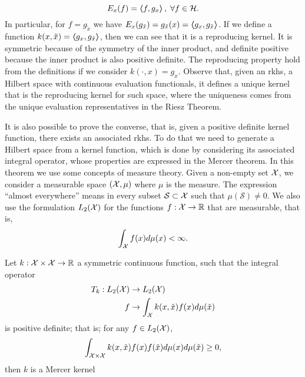 $$ E_x(f) = \bm{\left\langle} f, g_x \bm{\right\rangle}, \; \forall f \in \mathcal{H}.$$
In particular, for $f = g_{\tilde{x}}$ we have $E_x(g_{\tilde{x}}) = g_{{\tilde{x}}}(x) = \bm{\left\langle} g_x, g_{\tilde{x}} \bm{\right\rangle}$. If we define a function $k(x, \tilde{x}) = \bm{\left\langle} g_x, g_{\tilde{x}} \bm{\right\rangle}$, then we can see that it is a reproducing kernel. It is symmetric because of the symmetry of the inner product, and definite positive because the inner product is also positive definite. The reproducing property 
hold from the definitions if we consider $k(\cdot, x) = g_x$.
%
Observe that, given an \acrshort{rkhs}, a Hilbert space with continuous evaluation functionals, it defines a unique kernel that is the reproducing kernel for such space, where the uniqueness comes from the unique evaluation representatives in the Riesz Theorem.
%

It is also possible to prove the converse, that is, given a positive definite kernel function, there exists an associated \acrshort{rkhs}.
To do that we need to generate a Hilbert space from a kernel function, which is done by considering its associated integral operator, whose properties are expressed in the Mercer theorem. In this theorem we use some concepts of measure theory. 
%
Given a non-empty set $\mathcal{X}$, we consider a measurable space $(\mathcal{X}, \mu)$ where $\mu$ is the measure. The expression ``almost everywhere'' means in every subset $\mathcal{S} \subset \mathcal{X}$ such that $\mu(\mathcal{S}) \neq 0$. We also use the formulation $L_2(\mathcal{X})$ for the functions $f: \mathcal{X} \to \mathbb{R}$ that are measurable, that is,
$$ \int_{\mathcal{X}} f(x) d\mu(x) < \infty .$$

\begin{definition}
    Let $k: \mathcal{X} \times \mathcal{X} \to \mathbb{R}$ a symmetric continuous function, such that the integral operator 
    \begin{equation}
        \begin{aligned}
    \nonumber
    T_k: L_2(\mathcal{X}) &\to L_2(\mathcal{X}) \\
    f &\to \int_{\mathcal{X}} k(x, \tilde{x}) f(x) d \mu(\tilde{x}) 
\end{aligned}
\end{equation}    
is positive definite; that is; for any $f \in L_2(\mathcal{X})$, 
\begin{equation}
    \nonumber
    \int_{\mathcal{X} \times \mathcal{X}} k(x, \tilde{x}) f(x) f(\tilde{x}) d\mu(x) d\mu(\tilde{x}) \geq 0 ,
\end{equation}
then $k$ is a Mercer kernel
\end{definition}

